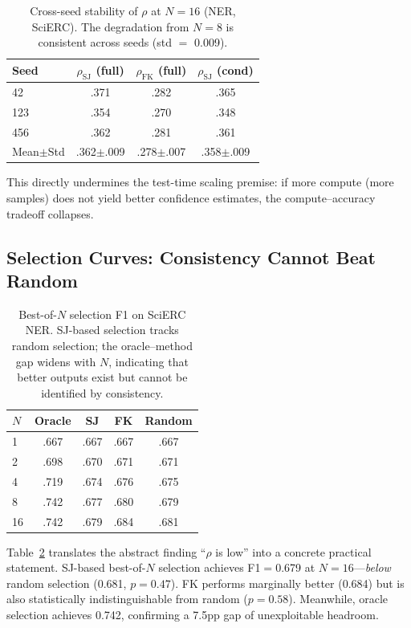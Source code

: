\documentclass[11pt,a4paper]{article}
\begin{document}
\begin{table}[t]
\centering
\small
\begin{tabular}{lccc}
\toprule
\textbf{Seed} & $\rho_{\text{SJ}}$ (full) & $\rho_{\text{FK}}$ (full) & $\rho_{\text{SJ}}$ (cond) \\
\midrule
42 & .371 & .282 & .365 \\
123 & .354 & .270 & .348 \\
456 & .362 & .281 & .361 \\
\midrule
Mean$\pm$Std & .362$\pm$.009 & .278$\pm$.007 & .358$\pm$.009 \\
\bottomrule
\end{tabular}
\caption{Cross-seed stability of $\rho$ at $N{=}16$ (NER, SciERC). The degradation from $N{=}8$ is consistent across seeds (std $=$ 0.009).}
\label{tab:crossseed}
\end{table}

This directly undermines the test-time scaling premise: if more compute (more samples) does not yield better confidence estimates, the compute--accuracy tradeoff collapses.

\subsection{Selection Curves: Consistency Cannot Beat Random}

\begin{table}[t]
\centering
\small
\begin{tabular}{lcccc}
\toprule
$N$ & Oracle & SJ & FK & Random \\
\midrule
1 & .667 & .667 & .667 & .667 \\
2 & .698 & .670 & .671 & .671 \\
4 & .719 & .674 & .676 & .675 \\
8 & .742 & .677 & .680 & .679 \\
16 & .742 & .679 & .684 & .681 \\
\bottomrule
\end{tabular}
\caption{Best-of-$N$ selection F1 on SciERC NER. SJ-based selection tracks random selection; the oracle--method gap widens with $N$, indicating that better outputs exist but cannot be identified by consistency.}
\label{tab:selection}
\end{table}

Table~\ref{tab:selection} translates the abstract finding ``$\rho$ is low'' into a concrete practical statement.
SJ-based best-of-$N$ selection achieves F1$=$0.679 at $N{=}16$---\emph{below} random selection (0.681, $p{=}0.47$).
FK performs marginally better (0.684) but is also statistically indistinguishable from random ($p{=}0.58$).
Meanwhile, oracle selection achieves 0.742, confirming a 7.5pp gap of unexploitable headroom.
\end{document}
